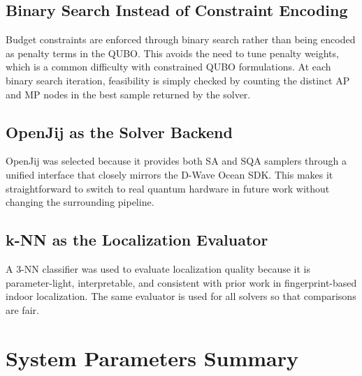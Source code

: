 \documentclass[12pt,a4paper]{article}
\begin{document}
\subsection{Binary Search Instead of Constraint Encoding}

Budget constraints are enforced through binary search rather than being
encoded as penalty terms in the QUBO. This avoids the need to tune penalty
weights, which is a common difficulty with constrained QUBO formulations.
At each binary search iteration, feasibility is simply checked by counting
the distinct AP and MP nodes in the best sample returned by the solver.

\subsection{OpenJij as the Solver Backend}

OpenJij was selected because it provides both SA and SQA samplers through a
unified interface that closely mirrors the D-Wave Ocean SDK. This makes it
straightforward to switch to real quantum hardware in future work without
changing the surrounding pipeline.

\subsection{k-NN as the Localization Evaluator}

A 3-NN classifier was used to evaluate localization quality because it is
parameter-light, interpretable, and consistent with prior work in
fingerprint-based indoor localization. The same evaluator is used for all
solvers so that comparisons are fair.

\section{System Parameters Summary}
\end{document}
